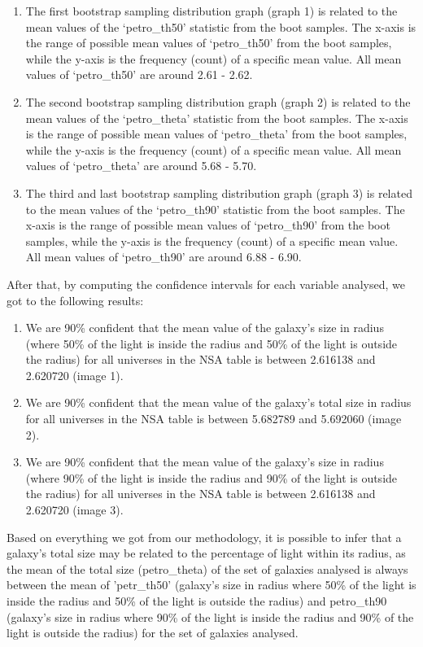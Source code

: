 \documentclass[12pt]{article}
\begin{document}
\begin{enumerate}
	\item The first bootstrap sampling distribution graph (graph 1) is related to the mean values of the `petro\_th50' statistic from the boot samples. The x-axis is the range of possible mean values of `petro\_th50' from the boot samples, while the y-axis is the frequency (count) of a specific mean value. All mean values of `petro\_th50' are around 2.61 - 2.62.
	\item The second bootstrap sampling distribution graph (graph 2) is related to the mean values of the `petro\_theta' statistic from the boot samples. The x-axis is the range of possible mean values of `petro\_theta' from the boot samples, while the y-axis is the frequency (count) of a specific mean value. All mean values of `petro\_theta' are around 5.68 - 5.70.
	\item The third and last bootstrap sampling distribution graph (graph 3) is related to the mean values of the `petro\_th90' statistic from the boot samples. The x-axis is the range of possible mean values of `petro\_th90' from the boot samples, while the y-axis is the frequency (count) of a specific mean value. All mean values of `petro\_th90' are around 6.88 - 6.90.
\end{enumerate}
\noindent
After that, by computing the confidence intervals for each variable analysed, we got to the following results:
\begin{enumerate}
	\item We are 90\% confident that the mean value of the galaxy's size in radius (where 50\% of the light is inside the radius and 50\% of the light is outside the radius) for all universes in the NSA table is between 2.616138 and 2.620720 (image 1).
	\item We are 90\% confident that the mean value of the galaxy's total size in radius for all universes in the NSA table is between 5.682789 and 5.692060 (image 2).
	\item We are 90\% confident that the mean value of the galaxy's size in radius (where 90\% of the light is inside the radius and 90\% of the light is outside the radius) for all universes in the NSA table is between 2.616138 and 2.620720 (image 3).
\end{enumerate}
Based on everything we got from our methodology, it is possible to infer that a galaxy's total size may be related to the percentage of light within its radius, as the mean of the total size (petro\_theta) of the set of galaxies analysed is always between the mean of 'petr\_th50' (galaxy's size in radius where 50\% of the light is inside the radius and 50\% of the light is outside the radius) and petro\_th90 (galaxy's size in radius where 90\% of the light is inside the radius and 90\% of the light is outside the radius) for the set of galaxies analysed.
\newpage
\end{document}
